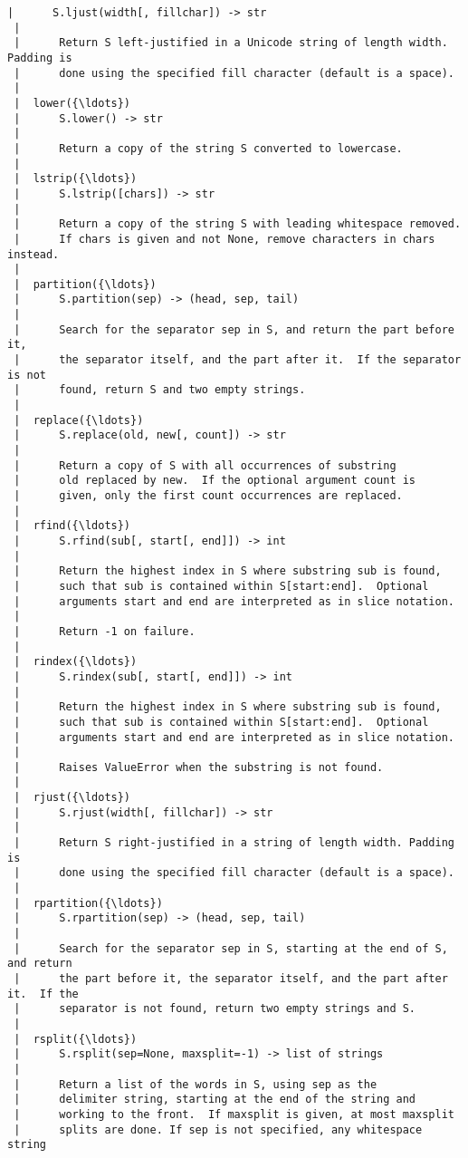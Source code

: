 \begin{Verbatim}[commandchars=\\\{\}]
 |      S.ljust(width[, fillchar]) -> str
 |      
 |      Return S left-justified in a Unicode string of length width. Padding is
 |      done using the specified fill character (default is a space).
 |  
 |  lower({\ldots})
 |      S.lower() -> str
 |      
 |      Return a copy of the string S converted to lowercase.
 |  
 |  lstrip({\ldots})
 |      S.lstrip([chars]) -> str
 |      
 |      Return a copy of the string S with leading whitespace removed.
 |      If chars is given and not None, remove characters in chars instead.
 |  
 |  partition({\ldots})
 |      S.partition(sep) -> (head, sep, tail)
 |      
 |      Search for the separator sep in S, and return the part before it,
 |      the separator itself, and the part after it.  If the separator is not
 |      found, return S and two empty strings.
 |  
 |  replace({\ldots})
 |      S.replace(old, new[, count]) -> str
 |      
 |      Return a copy of S with all occurrences of substring
 |      old replaced by new.  If the optional argument count is
 |      given, only the first count occurrences are replaced.
 |  
 |  rfind({\ldots})
 |      S.rfind(sub[, start[, end]]) -> int
 |      
 |      Return the highest index in S where substring sub is found,
 |      such that sub is contained within S[start:end].  Optional
 |      arguments start and end are interpreted as in slice notation.
 |      
 |      Return -1 on failure.
 |  
 |  rindex({\ldots})
 |      S.rindex(sub[, start[, end]]) -> int
 |      
 |      Return the highest index in S where substring sub is found,
 |      such that sub is contained within S[start:end].  Optional
 |      arguments start and end are interpreted as in slice notation.
 |      
 |      Raises ValueError when the substring is not found.
 |  
 |  rjust({\ldots})
 |      S.rjust(width[, fillchar]) -> str
 |      
 |      Return S right-justified in a string of length width. Padding is
 |      done using the specified fill character (default is a space).
 |  
 |  rpartition({\ldots})
 |      S.rpartition(sep) -> (head, sep, tail)
 |      
 |      Search for the separator sep in S, starting at the end of S, and return
 |      the part before it, the separator itself, and the part after it.  If the
 |      separator is not found, return two empty strings and S.
 |  
 |  rsplit({\ldots})
 |      S.rsplit(sep=None, maxsplit=-1) -> list of strings
 |      
 |      Return a list of the words in S, using sep as the
 |      delimiter string, starting at the end of the string and
 |      working to the front.  If maxsplit is given, at most maxsplit
 |      splits are done. If sep is not specified, any whitespace string

\end{Verbatim}
